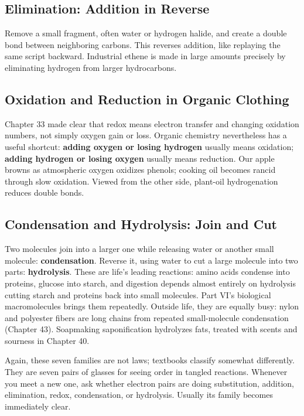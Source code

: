 \subsection{Elimination: Addition in Reverse}

Remove a small fragment, often water or hydrogen halide, and create a double bond between neighboring carbons. This reverses addition, like replaying the same script backward. Industrial ethene is made in large amounts precisely by eliminating hydrogen from larger hydrocarbons.

\subsection{Oxidation and Reduction in Organic Clothing}

Chapter 33 made clear that redox means electron transfer and changing oxidation numbers, not simply oxygen gain or loss. Organic chemistry nevertheless has a useful shortcut: \textbf{adding oxygen or losing hydrogen} usually means oxidation; \textbf{adding hydrogen or losing oxygen} usually means reduction. Our apple browns as atmospheric oxygen oxidizes phenols; cooking oil becomes rancid through slow oxidation. Viewed from the other side, plant-oil hydrogenation reduces double bonds.

\subsection{Condensation and Hydrolysis: Join and Cut}

Two molecules join into a larger one while releasing water or another small molecule: \textbf{condensation}. Reverse it, using water to cut a large molecule into two parts: \textbf{hydrolysis}. These are life's leading reactions: amino acids condense into proteins, glucose into starch, and digestion depends almost entirely on hydrolysis cutting starch and proteins back into small molecules. Part VI's biological macromolecules brings them repeatedly. Outside life, they are equally busy: nylon and polyester fibers are long chains from repeated small-molecule condensation (Chapter 43). Soapmaking saponification hydrolyzes fats, treated with scents and sourness in Chapter 40.

Again, these seven families are not laws; textbooks classify somewhat differently. They are seven pairs of glasses for seeing order in tangled reactions. Whenever you meet a new one, ask whether electron pairs are doing substitution, addition, elimination, redox, condensation, or hydrolysis. Usually its family becomes immediately clear.

